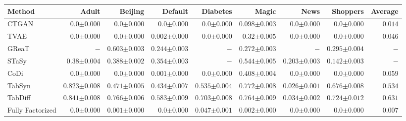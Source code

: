 \begin{tabular}{lrrrrrrr|r}
    \toprule[0.8pt]
     \textbf{Method} & \textbf{Adult} & \textbf{Beijing} & \textbf{Default} & \textbf{Diabetes} & \textbf{Magic} & \textbf{News} & \textbf{Shoppers} & \textbf{Average} \\
    \midrule 
    CTGAN & $0.0${\tiny${\pm 0.000}$} & $0.0${\tiny${\pm 0.000}$} & $0.0${\tiny${\pm 0.000}$} & $0.0${\tiny${\pm 0.000}$} & $0.098${\tiny${\pm 0.003}$} & $0.0${\tiny${\pm 0.000}$} & $0.0${\tiny${\pm 0.000}$} & $0.014$ \\
    TVAE & $0.0${\tiny${\pm 0.000}$} & $0.0${\tiny${\pm 0.000}$} & $0.002${\tiny${\pm 0.000}$} & $0.0${\tiny${\pm 0.000}$} & $0.32${\tiny${\pm 0.005}$} & $0.0${\tiny${\pm 0.000}$} & $0.0${\tiny${\pm 0.000}$} & $0.046$ \\
    GReaT & $-$ & $0.603${\tiny${\pm 0.003}$} & $0.244${\tiny${\pm 0.003}$} & $-$ & $0.272${\tiny${\pm 0.003}$} & $-$ & $0.295${\tiny${\pm 0.004}$} & $-$ \\
    STaSy & $0.38${\tiny${\pm 0.004}$} & $0.388${\tiny${\pm 0.002}$} & $0.354${\tiny${\pm 0.003}$} & $-$ & $0.544${\tiny${\pm 0.005}$} & $0.203${\tiny${\pm 0.003}$} & $0.142${\tiny${\pm 0.003}$} & $-$ \\
    CoDi & $0.0${\tiny${\pm 0.000}$} & $0.0${\tiny${\pm 0.000}$} & $0.001${\tiny${\pm 0.000}$} & $0.0${\tiny${\pm 0.000}$} & $0.408${\tiny${\pm 0.004}$} & $0.0${\tiny${\pm 0.000}$} & $0.0${\tiny${\pm 0.000}$} & $0.059$ \\
    TabSyn & $0.823${\tiny${\pm 0.008}$} & $0.471${\tiny${\pm 0.005}$} & $0.434${\tiny${\pm 0.007}$} & $0.535${\tiny${\pm 0.004}$} & $0.772${\tiny${\pm 0.008}$} & $0.026${\tiny${\pm 0.001}$} & $0.676${\tiny${\pm 0.008}$} & $0.534$ \\
    TabDiff & $0.841${\tiny${\pm 0.008}$} & $0.766${\tiny${\pm 0.006}$} & $0.583${\tiny${\pm 0.009}$} & $0.703${\tiny${\pm 0.008}$} & $0.764${\tiny${\pm 0.009}$} & $0.034${\tiny${\pm 0.002}$} & $0.724${\tiny${\pm 0.012}$} & $0.631$ \\
    \midrule
    Fully Factorized & $0.0${\tiny${\pm 0.000}$} & $0.001${\tiny${\pm 0.000}$} & $0.0${\tiny${\pm 0.000}$} & $0.047${\tiny${\pm 0.001}$} & $0.002${\tiny${\pm 0.000}$} & $0.0${\tiny${\pm 0.000}$} & $0.0${\tiny${\pm 0.000}$} & $0.007$ \\

\end{tabular}
